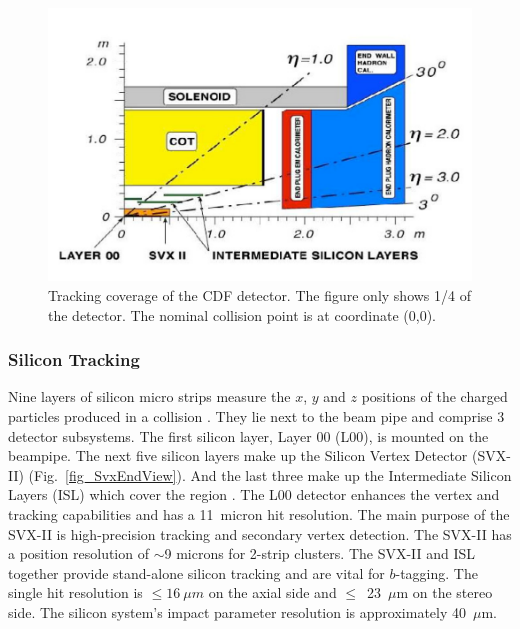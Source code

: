 \begin{figure}[htb!]
\begin{centering}
\includegraphics[scale=0.95]{CDF_TrackingCoverage.pdf}
\caption{Tracking coverage of the CDF detector. The figure only shows 1/4 of the detector. The nominal collision point is at coordinate (0,0).
}
\label{fig:TrackingCoverage}
\end{centering}
\end{figure}

\subsubsection{Silicon Tracking}\label{sec:SiliconTracking}
Nine layers of silicon micro strips measure the $x$, $y$ and $z$ positions of the charged particles produced in a collision \cite{pap:SiliconDetector}. They lie next to the beam pipe and comprise 3 detector subsystems. The first silicon layer, Layer 00 (L00), is mounted on the beampipe. The next five silicon layers make up the Silicon Vertex Detector (SVX-II) (Fig.~\ref{fig_SvxEndView}). And the last three make up the Intermediate Silicon Layers (ISL) which cover the region . The L00 detector enhances the vertex and tracking capabilities and has a 11~micron hit resolution. The main purpose of the SVX-II is high-precision tracking and secondary vertex detection. The SVX-II has a position resolution of $\sim$9 microns for 2-strip clusters. The SVX-II and ISL together provide stand-alone silicon tracking and are vital for $b$-tagging. The single hit resolution is \mbox{$\leq16~\mu m$} on the axial side and $\leq$~23~$\mu$m on the stereo side. The silicon system's impact parameter resolution is approximately 40~$\mu$m.

